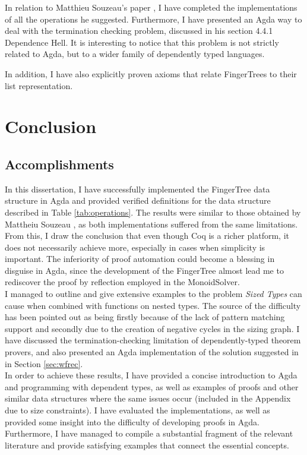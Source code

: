 \documentclass[12pt,twoside,notitlepage]{report}
\begin{document}
In relation to Matthieu Souzeau's paper \cite{coq}, I have completed the implementations of all the operations he suggested. Furthermore, I have presented an Agda way to deal with the termination checking problem, discussed in his section 4.4.1 Dependence Hell. 
It is interesting to notice that this problem is not strictly related to Agda, but to a wider family of dependently typed languages.  

In addition, I have also explicitly proven axioms that relate FingerTrees to their list representation.


\chapter{Conclusion}

\section{Accomplishments}

In this dissertation, I have successfully implemented the FingerTree data structure \cite{fingertrees} in Agda \cite{agdatutorial} and provided verified definitions for the data structure described in Table \ref{tab:operations}. The results were similar to those obtained by Mattheiu Souzeau \cite{coq}, as both implementations suffered from the same limitations. From this, I draw the conclusion that even though Coq is a richer platform, it does not necessarily achieve more, especially in cases when simplicity is important. The inferiority of proof automation could become a blessing in disguise in Agda, since the development of the FingerTree almost lead me to rediscover the proof by reflection employed in the MonoidSolver. \\
I managed to outline and give extensive examples to the problem \textit{Sized Types} can cause when combined with functions on nested types. The source of the difficulty has been pointed out as being firstly because of the lack of pattern matching support and secondly due to the creation of negative cycles in the sizing graph. 
I have discussed the termination-checking limitation of dependently-typed theorem provers, and also presented an Agda implementation of the solution suggested in \cite{coq} in Section \ref{sec:wfrec}. \\
In order to achieve these results, I have provided a concise introduction to Agda and programming with dependent types, as well as examples of proofs and other similar data structures where the same issues occur (included in the Appendix due to size constraints).
I have evaluated the implementations, as well as provided some insight into the difficulty of developing proofs in Agda. Furthermore, I have managed to compile a substantial fragment of the relevant literature and provide satisfying examples that connect the essential concepts. 
\end{document}
